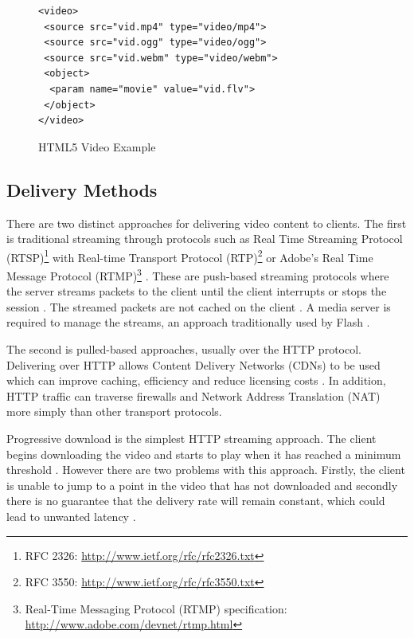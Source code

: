 \documentclass[journal]{IEEEtran}
\begin{document}
\begin{figure}
\caption{HTML5 Video Example}
\label{lst:HTML5VideoExample}
\begin{lstlisting}[frame=single,language=HTML5]
<video>
 <source src="vid.mp4" type="video/mp4">
 <source src="vid.ogg" type="video/ogg">
 <source src="vid.webm" type="video/webm">
 <object>
  <param name="movie" value="vid.flv">
 </object>
</video>
\end{lstlisting}
\end{figure}

\subsection{Delivery Methods}
There are two distinct approaches for delivering video content to clients. The first is traditional streaming through protocols such as Real Time Streaming Protocol (RTSP)\footnote{RFC 2326: \url{http://www.ietf.org/rfc/rfc2326.txt}} with Real-time Transport Protocol (RTP)\footnote{RFC 3550: \url{http://www.ietf.org/rfc/rfc3550.txt}} or Adobe's Real Time Message Protocol (RTMP)\footnote{Real-Time Messaging Protocol (RTMP) specification: \url{http://www.adobe.com/devnet/rtmp.html}} \cite{article:areWeInTheMiddleOfAVideoStreamingRevolution}. These are push-based streaming protocols where the server streams packets to the client until the client interrupts or stops the session \cite{article:watchingVideoOverTheWeb}. The streamed packets are not cached on the client \cite{article:watchingVideoOverTheWeb}. A media server is required to manage the streams, an approach traditionally used by Flash \cite{article:flashPlayer}.

The second is pulled-based approaches, usually over the HTTP protocol. Delivering over HTTP allows Content Delivery Networks (CDNs) to be used which can improve caching, efficiency and reduce licensing costs \cite{article:towardsVideoOnTheWebWithHTML5}\cite{inproceedings:HTTPAsTheNarrowWaist}. In addition, HTTP traffic can traverse firewalls and Network Address Translation (NAT) more simply than other transport protocols. %

Progressive download is the simplest HTTP streaming approach. The client begins downloading the video and starts to play when it has reached a minimum threshold \cite{article:watchingVideoOverTheWeb}. However there are two problems with this approach. Firstly, the client is unable to jump to a point in the video that has not downloaded and secondly there is no guarantee that the delivery rate will remain constant, which could lead to unwanted latency \cite{article:towardsVideoOnTheWebWithHTML5}. %
\end{document}
